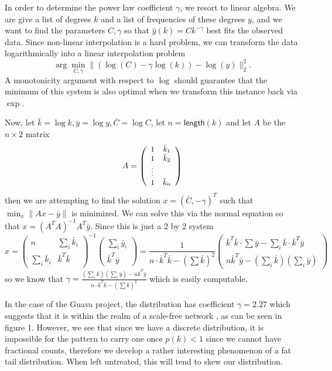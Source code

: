 \documentclass[11pt,a4paper]{article}
\newcommand{\pa}[1]{\left(#1\right)}
\newcommand{\g}[1]{\textsf{#1}}
\newcommand{\arr}[1]{\begin{array}{cccccccccc} #1\end{array}}
\newcommand{\mat}[1]{\left(\arr{#1}\right)}
\begin{document}
In order to determine the power law coefficient $\gamma$, we resort to linear
algebra. We are give a list of degrees $k$ and a list of frequencies of these 
degrees $y$, and we want to find the parameters $C,\gamma$ so that 
$\hat y(k) = Ck^{-\gamma}$ best fits the observed data. Since non-linear 
interpolation is a hard problem, we can transform the data logarithmically into
a linear interpolation problem
$$
\arg\min_{C,\gamma} \|(\log(C) - \gamma \log(k)) - \log(y)\|_2^2.
$$
A monotonicity argument with respect to $\log$ should guarantee that the
minimum of this system is also optimal when we transform this instance back
via $\exp$.

Now, let $\bar k = \log k, \bar y = \log y, \bar C = \log C$, let $n = \g{length}(k)$
 and let $A$ be the $n \times 2$ matrix 
 $$\small A = \mat{1 & \bar k_1 \\ 1 & \bar k_2 \\ \vdots \\ 1 & \bar k_n}$$ 
then we are attempting to find the solution $x = \pa{\bar C, -\gamma}^T$ such 
that $\min_x \|Ax - \bar y\|$ is minimized. We can solve this via the normal equation 
\cite{mcomp} so that  $x = (A^TA)^{-1}A^T\bar y$. Since this is just a 2 by 2 system
$$
x = \mat{n & \sum_i \bar k_i \\ \sum_i \bar k_i & \bar k^T\bar k}^{-1} 
\mat{\sum_i \bar y_i \\ \bar k^T\bar y} 
= \frac{1}{n\cdot \bar k^T\bar k - \pa{\sum \bar k}^2} 
\mat{\bar k^T \bar k \cdot \sum \bar y - \sum_i \bar k \cdot \bar k^T\bar y \\ 
n \bar k^T \bar y - \pa{\sum_i \bar k}\pa{\sum_i \bar y}}
$$
so we know that $\gamma = 
\frac{\pa{\sum_i \bar k}\pa{\sum_i \bar y}- 
n \bar k^T \bar y}{n\cdot \bar k^T\bar k - \pa{\sum \bar k}^2}$ which is easily
computable. 

In the case of the Guava project, the distribution has coefficient $\gamma = 2.27$
which suggests that it is within the realm of a scale-free network \cite{CLASS}, 
as can be seen in 
figure 1. However, we see that since we have a discrete distribution, it is impossible
for the pattern to carry one once $p(k) < 1$ since we cannot have fractional counts,
therefore we develop a rather interesting phenomenon of a fat tail distribution.
When left untreated, this will tend to skew our distribution.
\end{document}

